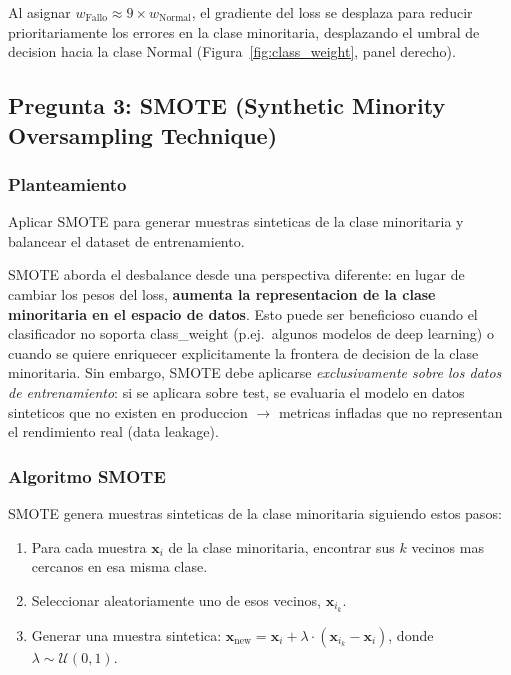 \documentclass[12pt,a4paper]{article}
\begin{document}
Al asignar $w_{\text{Fallo}} \approx 9 \times w_{\text{Normal}}$, el gradiente del loss se
desplaza para reducir prioritariamente los errores en la clase minoritaria, desplazando el
umbral de decision hacia la clase Normal (Figura~\ref{fig:class_weight}, panel derecho).

\subsection{Pregunta 3: SMOTE (Synthetic Minority Oversampling Technique)}

\subsubsection*{Planteamiento}
Aplicar SMOTE para generar muestras sinteticas de la clase minoritaria y balancear el dataset
de entrenamiento.

\begin{tcolorbox}[porquebox, title={Por que SMOTE y por que solo en entrenamiento?}]
SMOTE aborda el desbalance desde una perspectiva diferente: en lugar de cambiar los pesos del
loss, \textbf{aumenta la representacion de la clase minoritaria en el espacio de datos}.
Esto puede ser beneficioso cuando el clasificador no soporta class\_weight (p.ej.\ algunos
modelos de deep learning) o cuando se quiere enriquecer explicitamente la frontera de decision
de la clase minoritaria. Sin embargo, SMOTE debe aplicarse \textit{exclusivamente sobre los
datos de entrenamiento}: si se aplicara sobre test, se evaluaria el modelo en datos sinteticos
que no existen en produccion $\to$ metricas infladas que no representan el rendimiento real
(data leakage).
\end{tcolorbox}

\subsubsection*{Algoritmo SMOTE}

SMOTE genera muestras sinteticas de la clase minoritaria siguiendo estos pasos:
\begin{enumerate}[label=\textbf{\arabic*.}]
  \item Para cada muestra $\mathbf{x}_i$ de la clase minoritaria, encontrar sus $k$ vecinos
    mas cercanos en esa misma clase.
  \item Seleccionar aleatoriamente uno de esos vecinos, $\mathbf{x}_{i_k}$.
  \item Generar una muestra sintetica:
    $\mathbf{x}_{\text{new}} = \mathbf{x}_i + \lambda \cdot (\mathbf{x}_{i_k} - \mathbf{x}_i)$,
    donde $\lambda \sim \mathcal{U}(0,1)$.
\end{enumerate}
\end{document}
